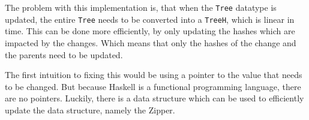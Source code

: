 The problem with this implementation is, that when the \texttt{Tree} datatype is updated, the entire \texttt{Tree} needs to be converted into a \texttt{TreeH}, which is linear in time. This can be done more efficiently, by only updating the hashes which are impacted by the changes. Which means that only the hashes of the change and the parents need to be updated. 

The first intuition to fixing this would be using a pointer to the value that needs to be changed. But because Haskell is a functional programming language, there are no pointers. Luckily, there is a data structure which can be used to efficiently update the data structure, namely the Zipper\cite{huet1997zipper}.

